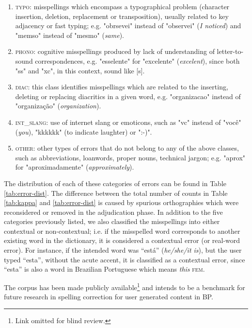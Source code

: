 \begin{enumerate}
\setlength{\itemsep}{1pt}
\item \textsc{typo}: misspellings which encompass a typographical problem (character insertion, deletion, replacement or transposition), usually related to key adjacency or fast typing; e.g. "obrsevei" instead of "observei" (\emph{I noticed}) and "memso" instead of "mesmo" (\emph{same}).
\item \textsc{phono}: cognitive misspellings produced by lack of understanding of letter-to-sound correspondences, e.g. "esselente" for "excelente" (\emph{excelent}), since both "ss" and "xc", in this context, sound like [s]. 
\item \textsc{diac}: this class identifies misspellings which are related to the inserting, deleting or replacing diacritics in a given word, e.g. "organizacao" instead of "organiza\c{c}\~ao" (\emph{organization}).
\item \textsc{int\_slang}: use of internet slang or emoticons, such as "vc" instead of "voc\^e" (\emph{you}), "kkkkkk" (to indicate laughter) or ":-)".
\item \textsc{other}: other types of errors that do not belong to any of the above classes, such as abbreviations, loanwords, proper nouns, technical jargon; e.g. "aprox" for "aproximadamente" (\emph{approximately}).
\end{enumerate}

The distribution of each of these categories of errors can be found in Table \ref{tab:error-dist}. The difference between the total number of counts in  Table \ref{tab:kappa} and \ref{tab:error-dist} is caused by 
spurious orthographies which were reconsidered or removed in the adjudication phase. In addition to the five categories previously listed, we also classified the misspellings into either contextual or non-contextual; i.e. if the misspelled word corresponds to another existing word in the dictionary, it is considered a contextual error (or real-word error). For instance, if the intended word was ``est\'a'' (\emph{he/she/it is}), but the user typed ``esta'', without the acute accent, it is classified as a contextual error, since ``esta'' is also a word in Brazilian Portuguese which means \emph{this} \textsc{fem}. 

The corpus has been made publicly available\footnote{Link omitted for blind review.} and intends to be a benchmark for future research in spelling correction for user generated content in BP.

